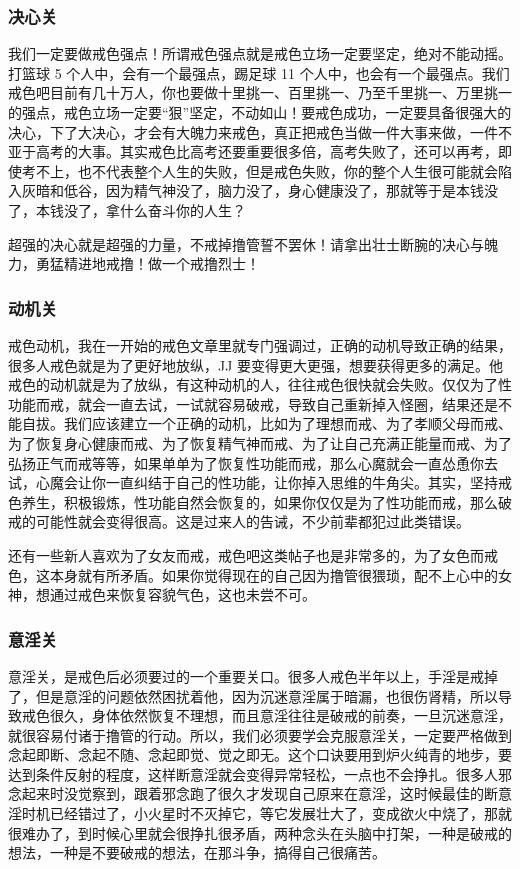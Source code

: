 \subsubsection{决心关}

我们一定要做戒色强点！所谓戒色强点就是戒色立场一定要坚定，绝对不能动摇。打篮球 5 个人中，会有一个最强点，踢足球 11 个人中，也会有一个最强点。我们戒色吧目前有几十万人，你也要做十里挑一、百里挑一、乃至千里挑一、万里挑一的强点，戒色立场一定要“狠”坚定，不动如山！要戒色成功，一定要具备很强大的决心，下了大决心，才会有大魄力来戒色，真正把戒色当做一件大事来做，一件不亚于高考的大事。其实戒色比高考还要重要很多倍，高考失败了，还可以再考，即使考不上，也不代表整个人生的失败，但是戒色失败，你的整个人生很可能就会陷入灰暗和低谷，因为精气神没了，脑力没了，身心健康没了，那就等于是本钱没了，本钱没了，拿什么奋斗你的人生？

超强的决心就是超强的力量，不戒掉撸管誓不罢休！请拿出壮士断腕的决心与魄力，勇猛精进地戒撸！做一个戒撸烈士！

\subsubsection{动机关}

戒色动机，我在一开始的戒色文章里就专门强调过，正确的动机导致正确的结果，很多人戒色就是为了更好地放纵，JJ 要变得更大更强，想要获得更多的满足。他戒色的动机就是为了放纵，有这种动机的人，往往戒色很快就会失败。仅仅为了性功能而戒，就会一直去试，一试就容易破戒，导致自己重新掉入怪圈，结果还是不能自拔。我们应该建立一个正确的动机，比如为了理想而戒、为了孝顺父母而戒、为了恢复身心健康而戒、为了恢复精气神而戒、为了让自己充满正能量而戒、为了弘扬正气而戒等等，如果单单为了恢复性功能而戒，那么心魔就会一直怂恿你去试，心魔会让你一直纠结于自己的性功能，让你掉入思维的牛角尖。其实，坚持戒色养生，积极锻炼，性功能自然会恢复的，如果你仅仅是为了性功能而戒，那么破戒的可能性就会变得很高。这是过来人的告诫，不少前辈都犯过此类错误。

还有一些新人喜欢为了女友而戒，戒色吧这类帖子也是非常多的，为了女色而戒色，这本身就有所矛盾。如果你觉得现在的自己因为撸管很猥琐，配不上心中的女神，想通过戒色来恢复容貌气色，这也未尝不可。

\subsubsection{意淫关}

意淫关，是戒色后必须要过的一个重要关口。很多人戒色半年以上，手淫是戒掉了，但是意淫的问题依然困扰着他，因为沉迷意淫属于暗漏，也很伤肾精，所以导致戒色很久，身体依然恢复不理想，而且意淫往往是破戒的前奏，一旦沉迷意淫，就很容易付诸于撸管的行动。所以，我们必须要学会克服意淫关，一定要严格做到念起即断、念起不随、念起即觉、觉之即无。这个口诀要用到炉火纯青的地步，要达到条件反射的程度，这样断意淫就会变得异常轻松，一点也不会挣扎。很多人邪念起来时没觉察到，跟着邪念跑了很久才发现自己原来在意淫，这时候最佳的断意淫时机已经错过了，小火星时不灭掉它，等它发展壮大了，变成欲火中烧了，那就很难办了，到时候心里就会很挣扎很矛盾，两种念头在头脑中打架，一种是破戒的想法，一种是不要破戒的想法，在那斗争，搞得自己很痛苦。

